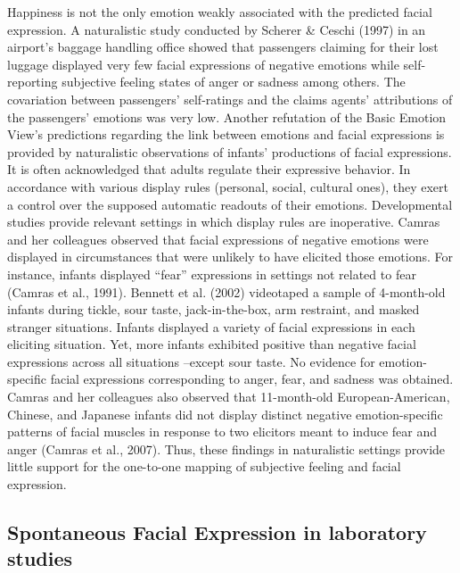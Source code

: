 \documentclass[
  english,
  man]{apa7}
\begin{document}
Happiness is not the only emotion weakly associated with the predicted facial expression. A naturalistic study conducted by Scherer \& Ceschi (1997) in an airport's baggage handling office showed that passengers claiming for their lost luggage displayed very few facial expressions of negative emotions while self-reporting subjective feeling states of anger or sadness among others. The covariation between passengers' self-ratings and the claims agents' attributions of the passengers' emotions was very low. Another refutation of the Basic Emotion View's predictions regarding the link between emotions and facial expressions is provided by naturalistic observations of infants' productions of facial expressions. It is often acknowledged that adults regulate their expressive behavior. In accordance with various display rules (personal, social, cultural ones), they exert a control over the supposed automatic readouts of their emotions. Developmental studies provide relevant settings in which display rules are inoperative. Camras and her colleagues observed that facial expressions of negative emotions were displayed in circumstances that were unlikely to have elicited those emotions. For instance, infants displayed ``fear'' expressions in settings not related to fear (Camras et al., 1991). Bennett et al. (2002) videotaped a sample of 4-month-old infants during tickle, sour taste, jack-in-the-box, arm restraint, and masked stranger situations. Infants displayed a variety of facial expressions in each eliciting situation. Yet, more infants exhibited positive than negative facial expressions across all situations --except sour taste. No evidence for emotion-specific facial expressions corresponding to anger, fear, and sadness was obtained. Camras and her colleagues also observed that 11-month-old European-American, Chinese, and Japanese infants did not display distinct negative emotion-specific patterns of facial muscles in response to two elicitors meant to induce fear and anger (Camras et al., 2007). Thus, these findings in naturalistic settings provide little support for the one-to-one mapping of subjective feeling and facial expression.

\hypertarget{spontaneous-facial-expression-in-laboratory-studies}{%
\subsection{Spontaneous Facial Expression in laboratory studies}\label{spontaneous-facial-expression-in-laboratory-studies}}
\end{document}
